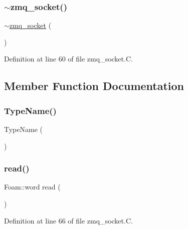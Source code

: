 \subsubsection{\texorpdfstring{$\sim$zmq\+\_\+socket()}{~zmq\_socket()}}
{\footnotesize\ttfamily $\sim$\hyperlink{classFoam_1_1zmq__socket}{zmq\+\_\+socket} (\begin{DoxyParamCaption}{ }\end{DoxyParamCaption})\hspace{0.3cm}{\ttfamily [virtual]}}



Definition at line 60 of file zmq\+\_\+socket.\+C.



\subsection{Member Function Documentation}
\mbox{\label{classFoam_1_1zmq__socket_ac7db4bd1db722832031f949eaffa2c10}} 
\subsubsection{\texorpdfstring{Type\+Name()}{TypeName()}}
{\footnotesize\ttfamily Type\+Name (\begin{DoxyParamCaption}\item[{\char`\"{}zmq\+\_\+socket\char`\"{}}]{ }\end{DoxyParamCaption})}

\mbox{\label{classFoam_1_1zmq__socket_aaef38f7ec08b1ae0135900e9ae1fb1f8}} 
\subsubsection{\texorpdfstring{read()}{read()}}
{\footnotesize\ttfamily Foam\+::word read (\begin{DoxyParamCaption}{ }\end{DoxyParamCaption})}



Definition at line 66 of file zmq\+\_\+socket.\+C.



